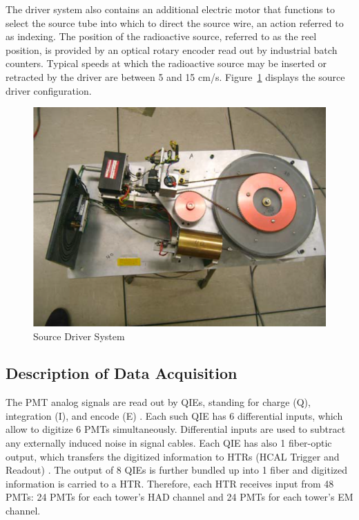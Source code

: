 The driver system also contains an additional electric motor that functions to
select the source tube into which to direct the source wire, an action referred
to as indexing. The position of the radioactive source, referred to as the reel position, is provided by an optical rotary
encoder read out by industrial batch counters. Typical speeds at which the
radioactive source may be inserted or retracted by the driver are between 5 and
15 cm/s. Figure~\ref{fig:hf_expsetup_sourcedriver} displays the source driver configuration.
\begin{figure}[htb]
   \begin{center}
      \includegraphics[width=.8\textwidth]{figures/ch_hfcalibration/Source_Driver.png}
      \caption{Source Driver System}
      \label{fig:hf_expsetup_sourcedriver}
   \end{center}
\end{figure}

\subsection{Description of Data Acquisition}
The PMT analog signals are read out by QIEs, standing for charge (Q),
integration (I), and encode (E) \cite{QIE-1}. Each such QIE has 6 differential inputs, which
allow to digitize 6 PMTs simultaneously. Differential inputs are used to subtract
any externally induced noise in signal cables. Each QIE has also 1 fiber-optic
output, which transfers the digitized information to HTRs (HCAL Trigger and
Readout) \cite{HTR}. The output of 8 QIEs is further bundled up into 1 fiber and digitized information is carried to a HTR. Therefore, each HTR receives input from 48 PMTs: 24 PMTs for each tower's HAD channel and 24 PMTs for each tower's EM channel.

